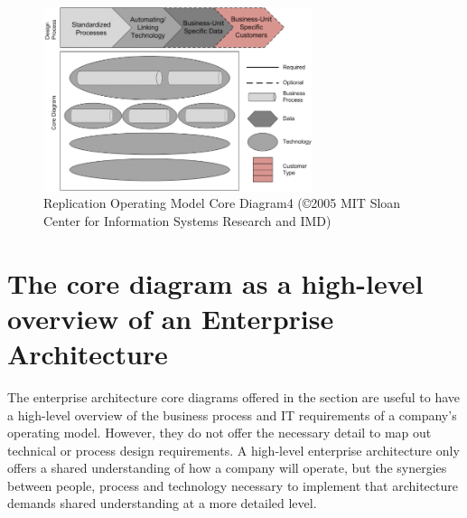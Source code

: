 \begin{figure}[ht]
    \centering
    \includegraphics[width=0.7\textwidth]{../images/replication-operating-model-core-diagram4.png}
    \caption{Replication Operating Model Core Diagram4 (©2005 MIT Sloan Center for Information Systems Research and IMD)}
    \label{fig:ekgmm-ea-replication-operating-model-core-diagram4}
\end{figure}

\section*{The core diagram as a high-level overview of an Enterprise Architecture}

The enterprise architecture core diagrams offered in the section are useful to have a high-level overview of the
business process and IT requirements of a company’s operating model.
However, they do not offer the necessary detail to map out technical or process design requirements.
A high-level enterprise architecture only offers a shared understanding of how a company will operate,
but the synergies between people, process and technology necessary to implement that architecture demands
shared understanding at a more detailed level.
